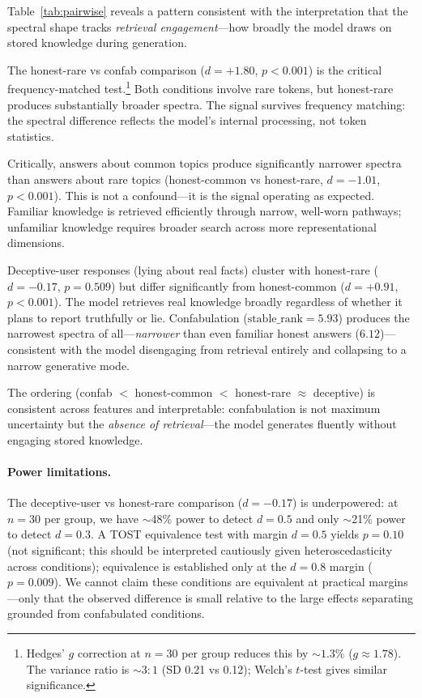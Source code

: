 \documentclass[11pt,a4paper]{article}
\begin{document}
Table~\ref{tab:pairwise} reveals a pattern consistent with the
interpretation that the spectral shape tracks \emph{retrieval
  engagement}---how broadly the model draws on stored knowledge during
generation.

The honest-rare vs confab comparison ($d = +1.80$, $p < 0.001$) is
the critical frequency-matched test.\footnote{Hedges' $g$ correction
at $n = 30$ per group reduces this by ${\sim}1.3\%$ ($g \approx 1.78$).
The variance ratio is ${\sim}3{:}1$ (SD 0.21 vs 0.12); Welch's $t$-test
gives similar significance.} Both conditions involve rare
tokens, but honest-rare produces substantially broader spectra. The
signal survives frequency matching: the spectral difference reflects
the model's internal processing, not token statistics.

Critically, answers about common topics produce significantly narrower
spectra than answers about rare topics (honest-common vs honest-rare,
$d = -1.01$, $p < 0.001$). This is not a confound---it is the signal
operating as expected. Familiar knowledge is retrieved efficiently
through narrow, well-worn pathways; unfamiliar knowledge requires
broader search across more representational dimensions.

Deceptive-user responses (lying about real facts) cluster with
honest-rare ($d = -0.17$, $p = 0.509$) but differ significantly from
honest-common ($d = +0.91$, $p < 0.001$). The model retrieves real
knowledge broadly regardless of whether it plans to report truthfully
or lie. Confabulation ($\text{stable\_rank} = 5.93$) produces the
narrowest spectra of all---\emph{narrower} than even familiar honest
answers ($6.12$)---consistent with the model disengaging from
retrieval entirely and collapsing to a narrow generative mode.

The ordering (confab $<$ honest-common $<$ honest-rare $\approx$
deceptive) is consistent across features and interpretable:
confabulation is not maximum uncertainty but the \emph{absence of
  retrieval}---the model generates fluently without engaging stored
knowledge.

\paragraph{Power limitations.}
The deceptive-user vs honest-rare comparison ($d = -0.17$) is
underpowered: at $n = 30$ per group, we have $\sim$48\% power to
detect $d = 0.5$ and only $\sim$21\% power to detect $d = 0.3$. A
TOST equivalence test with margin $d = 0.5$ yields $p = 0.10$ (not
significant; this should be interpreted cautiously given heteroscedasticity
across conditions); equivalence is established only at the $d = 0.8$ margin
($p = 0.009$). We cannot claim these conditions are equivalent at
practical margins---only that the observed difference is small
relative to the large effects separating grounded from confabulated
conditions.
\end{document}
